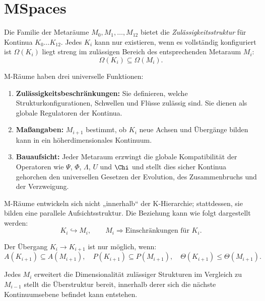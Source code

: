 

\section{MSpaces}
\label{sec:mspaces-overview}

Die Familie der Metaräume $M_0, M_1, \dots, M_{12}$ bietet die
\emph{Zulässigkeitsstruktur} für Kontinua $K_0\dots K_{12}$.
Jedes $K_i$ kann nur existieren, wenn es vollständig konfiguriert ist
$\Omega(K_i)$ liegt streng im zulässigen Bereich des entsprechenden
Metaraum $M_i$:
\[
\Omega(K_i) \subseteq \Omega(M_i).
\]

M-Räume haben drei universelle Funktionen:

\begin{enumerate}
    \item \textbf{Zulässigkeitsbeschränkungen:}
    Sie definieren, welche Strukturkonfigurationen, Schwellen und Flüsse zulässig sind.
    Sie dienen als globale Regulatoren der Kontinua.

    \item \textbf{Maßangaben:}
    $M_{i+1}$ bestimmt, ob $K_i$ neue Achsen und Übergänge bilden kann
    in ein höherdimensionales Kontinuum.

    \item \textbf{Bauaufsicht:}
    Jeder Metaraum erzwingt die globale Kompatibilität der Operatoren
    wie $\Psi$, $\Phi$, $\Lambda$, $U$ und $\Chi$ und stellt dies sicher
    Kontinua gehorchen den universellen Gesetzen der Evolution, des Zusammenbruchs und der Verzweigung.
\end{enumerate}

M-Räume entwickeln sich nicht „innerhalb“ der K-Hierarchie; stattdessen,
sie bilden eine parallele Aufsichtsstruktur.
Die Beziehung kann wie folgt dargestellt werden:
\[
K_i \hookrightarrow M_i,\qquad
M_i \Rightarrow \text{Einschränkungen für } K_i.
\]

Der Übergang $K_i \to K_{i+1}$ ist nur möglich, wenn:
\[
A(K_{i+1}) \subseteq A(M_{i+1}), \quad
P(K_{i+1}) \subseteq P(M_{i+1}),\quad
\Theta(K_{i+1}) \leq \Theta(M_{i+1}).
\]

Jedes $M_i$ erweitert die Dimensionalität zulässiger Strukturen im Vergleich zu
$M_{i-1}$ stellt die Überstruktur bereit, innerhalb derer sich die nächste Kontinuumsebene befindet
kann entstehen.
